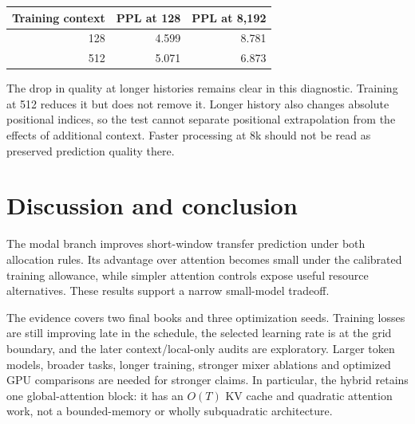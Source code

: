 \documentclass[11pt,letterpaper]{article}
\begin{document}
\begin{center}\begin{minipage}{\textwidth}\centering\small
{}
\label{tab:context}

\begin{tabular}{rrr}\toprule
Training context & PPL at 128 & PPL at 8,192\\\midrule
128 & 4.599 & 8.781 \\
512 & 5.071 & 6.873 \\
\bottomrule\end{tabular}


\end{minipage}\end{center}

The drop in quality at longer histories remains clear in this diagnostic. Training at 512 reduces it but does not remove it. Longer history also changes absolute positional indices, so the test cannot separate positional extrapolation from the effects of additional context. Faster processing at 8k should not be read as preserved prediction quality there.

\section{Discussion and conclusion}
The modal branch improves short-window transfer prediction under both allocation rules. Its advantage over attention becomes small under the calibrated training allowance, while simpler attention controls expose useful resource alternatives. These results support a narrow small-model tradeoff.

The evidence covers two final books and three optimization seeds. Training losses are still improving late in the schedule, the selected learning rate is at the grid boundary, and the later context/local-only audits are exploratory. Larger token models, broader tasks, longer training, stronger mixer ablations and optimized GPU comparisons are needed for stronger claims. In particular, the hybrid retains one global-attention block: it has an $O(T)$ KV cache and quadratic attention work, not a bounded-memory or wholly subquadratic architecture.
\end{document}
